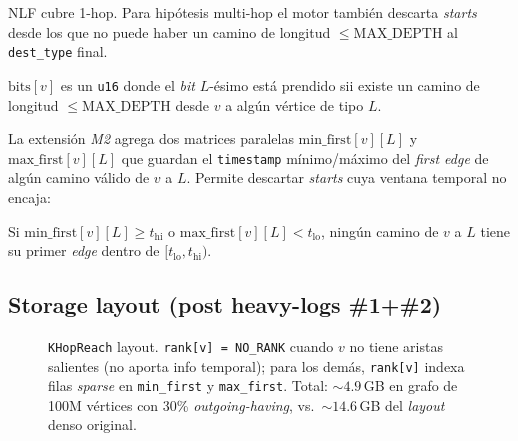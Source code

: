NLF cubre 1-hop. Para hipótesis multi-hop el motor también descarta
\emph{starts} desde los que no puede haber un camino de longitud
\(\leq \mathrm{MAX\_DEPTH}\) al \texttt{dest\_type} final.

\begin{definition}
\(\mathrm{bits}[v]\) es un \texttt{u16} donde el \emph{bit} \(L\)-ésimo
está prendido sii existe un camino de longitud
\(\leq \mathrm{MAX\_DEPTH}\) desde \(v\) a algún vértice de tipo \(L\).
\end{definition}

La extensión \emph{M2} agrega dos matrices paralelas
\(\mathrm{min\_first}[v][L]\) y \(\mathrm{max\_first}[v][L]\) que
guardan el \texttt{timestamp} mínimo/máximo del \emph{first edge} de
algún camino válido de \(v\) a \(L\). Permite descartar \emph{starts}
cuya ventana temporal no encaja:

\begin{theorem}
Si \(\mathrm{min\_first}[v][L] \geq t_{\mathrm{hi}}\) o
\(\mathrm{max\_first}[v][L] < t_{\mathrm{lo}}\), ningún camino de \(v\)
a \(L\) tiene su primer \emph{edge} dentro de
\([t_{\mathrm{lo}}, t_{\mathrm{hi}})\).
\end{theorem}

\subsection{Storage layout (post heavy-logs \#1+\#2)}

\begin{figure}[H]
\centering
{}
\caption{\texttt{KHopReach} layout. \texttt{rank[v] = NO\_RANK} cuando
\(v\) no tiene aristas salientes (no aporta info temporal); para los
demás, \texttt{rank[v]} indexa filas \emph{sparse} en \texttt{min\_first}
y \texttt{max\_first}. Total: \(\sim 4.9\)\,GB en grafo de 100M
vértices con 30\% \emph{outgoing-having}, vs.\ \(\sim 14.6\)\,GB del
\emph{layout} denso original.}
\label{fig:indexes-khop-layout}
\end{figure}

